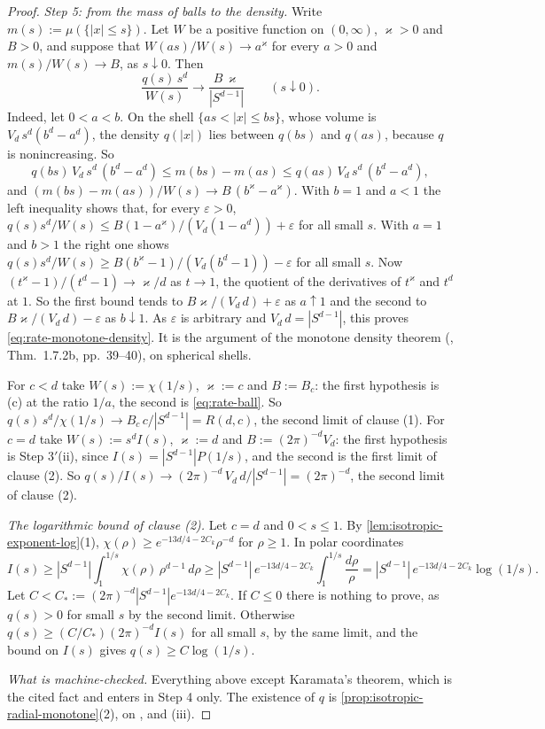 \begin{proof}
\emph{Step 5: from the mass of balls to the density.} Write $m(s) := \mu(\{|x| \le s\})$. Let
$W$ be a positive function on $(0,\infty)$, $\varkappa > 0$ and $B > 0$, and suppose that
$W(as)/W(s) \to a^{\varkappa}$ for every $a > 0$ and $m(s)/W(s) \to B$, as $s \downarrow 0$. Then
\begin{equation}\label{eq:rate-monotone-density}
  \frac{q(s)\,s^{d}}{W(s)} \to \frac{B\,\varkappa}{|S^{d-1}|} \qquad (s \downarrow 0) .
\end{equation}
Indeed, let $0 < a < b$. On the shell $\{as < |x| \le bs\}$, whose volume is
$V_d\,s^{d}(b^{d} - a^{d})$, the density $q(|x|)$ lies between $q(bs)$ and $q(as)$, because $q$ is
nonincreasing. So
\[
  q(bs)\,V_d\,s^{d}\,(b^{d} - a^{d}) \le m(bs) - m(as) \le q(as)\,V_d\,s^{d}\,(b^{d} - a^{d}) ,
\]
and $(m(bs) - m(as))/W(s) \to B\,(b^{\varkappa} - a^{\varkappa})$. With $b = 1$ and $a < 1$ the left
inequality shows that, for every $\varepsilon > 0$, $q(s)s^{d}/W(s) \le
B(1 - a^{\varkappa})/(V_d(1 - a^{d})) + \varepsilon$ for all small $s$. With $a = 1$ and $b > 1$ the
right one shows $q(s)s^{d}/W(s) \ge B(b^{\varkappa} - 1)/(V_d(b^{d} - 1)) - \varepsilon$ for all small
$s$. Now $(t^{\varkappa} - 1)/(t^{d} - 1) \to \varkappa/d$ as $t \to 1$, the quotient of the
derivatives of $t^{\varkappa}$ and $t^{d}$ at $1$. So the first bound tends to
$B\varkappa/(V_d\,d) + \varepsilon$ as $a \uparrow 1$ and the second to
$B\varkappa/(V_d\,d) - \varepsilon$ as $b \downarrow 1$. As $\varepsilon$ is arbitrary and
$V_d\,d = |S^{d-1}|$, this proves \ref{eq:rate-monotone-density}. It is the argument of the
monotone density theorem (, Thm.~1.7.2b, pp.~39--40), on spherical
shells.

For $c < d$ take $W(s) := \chi(1/s)$, $\varkappa := c$ and $B := B_c$: the first hypothesis is (c)
at the ratio $1/a$, the second is \ref{eq:rate-ball}. So
$q(s)\,s^{d}/\chi(1/s) \to B_c\,c/|S^{d-1}| = R(d,c)$, the second limit of clause (1). For $c = d$
take $W(s) := s^{d}I(s)$, $\varkappa := d$ and $B := (2\pi)^{-d}V_d$: the first hypothesis is
Step 3$'$(ii), since $I(s) = |S^{d-1}|P(1/s)$, and the second is the first limit of clause (2).
So $q(s)/I(s) \to (2\pi)^{-d}\,V_d\,d/|S^{d-1}| = (2\pi)^{-d}$, the second limit of clause (2).

\emph{The logarithmic bound of clause (2).} Let $c = d$ and $0 < s \le 1$. By
\ref{lem:isotropic-exponent-log}(1), $\chi(\rho) \ge e^{-13d/4 - 2C_k}\rho^{-d}$ for $\rho \ge 1$.
In polar coordinates
\[
  I(s) \ge |S^{d-1}|\int_1^{1/s}\chi(\rho)\,\rho^{d-1}\,d\rho
   \ge |S^{d-1}|\,e^{-13d/4 - 2C_k}\int_1^{1/s}\frac{d\rho}{\rho}
   = |S^{d-1}|\,e^{-13d/4 - 2C_k}\log(1/s) .
\]
Let $C < C_* := (2\pi)^{-d}|S^{d-1}|e^{-13d/4-2C_k}$. If $C \le 0$ there is nothing to prove, as
$q(s) > 0$ for small $s$ by the second limit. Otherwise $q(s) \ge (C/C_*)(2\pi)^{-d}I(s)$ for all
small $s$, by the same limit, and the bound on $I(s)$ gives $q(s) \ge C\log(1/s)$.

\emph{What is machine-checked.} Everything above except Karamata's theorem, which is the cited
fact  and enters in Step 4 only. The existence of $q$ is
\ref{prop:isotropic-radial-monotone}(2), on ,  and (iii).
\end{proof}

